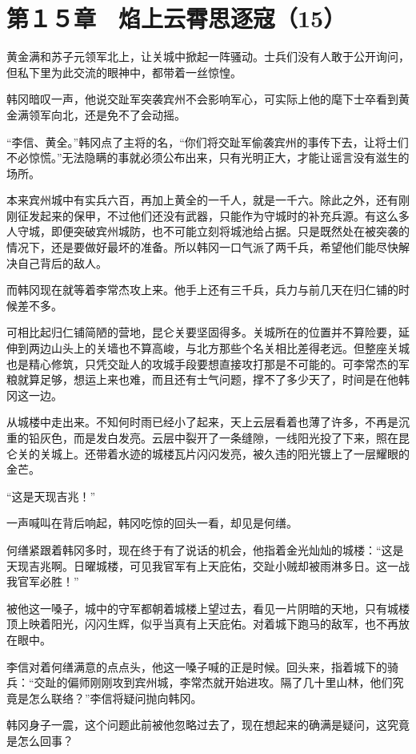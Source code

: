 \section{第１５章　焰上云霄思逐寇（15）}

黄金满和苏子元领军北上，让关城中掀起一阵骚动。士兵们没有人敢于公开询问，但私下里为此交流的眼神中，都带着一丝惊惶。

韩冈暗叹一声，他说交趾军突袭宾州不会影响军心，可实际上他的麾下士卒看到黄金满领军向北，还是免不了会动摇。

“李信、黄全。”韩冈点了主将的名，“你们将交趾军偷袭宾州的事传下去，让将士们不必惊慌。”无法隐瞒的事就必须公布出来，只有光明正大，才能让谣言没有滋生的场所。

本来宾州城中有实兵六百，再加上黄全的一千人，就是一千六。除此之外，还有刚刚征发起来的保甲，不过他们还没有武器，只能作为守城时的补充兵源。有这么多人守城，即便突破宾州城防，也不可能立刻将城池给占据。只是既然处在被突袭的情况下，还是要做好最坏的准备。所以韩冈一口气派了两千兵，希望他们能尽快解决自己背后的敌人。

而韩冈现在就等着李常杰攻上来。他手上还有三千兵，兵力与前几天在归仁铺的时候差不多。

可相比起归仁铺简陋的营地，昆仑关要坚固得多。关城所在的位置并不算险要，延伸到两边山头上的关墙也不算高峻，与北方那些个名关相比差得老远。但整座关城也是精心修筑，只凭交趾人的攻城手段要想直接攻打那是不可能的。可李常杰的军粮就算足够，想运上来也难，而且还有士气问题，撑不了多少天了，时间是在他韩冈这一边。

从城楼中走出来。不知何时雨已经小了起来，天上云层看着也薄了许多，不再是沉重的铅灰色，而是发白发亮。云层中裂开了一条缝隙，一线阳光投了下来，照在昆仑关的关城上。还带着水迹的城楼瓦片闪闪发亮，被久违的阳光镀上了一层耀眼的金芒。

“这是天现吉兆！”

一声喊叫在背后响起，韩冈吃惊的回头一看，却见是何缮。

何缮紧跟着韩冈多时，现在终于有了说话的机会，他指着金光灿灿的城楼：“这是天现吉兆啊。日曜城楼，可见我官军有上天庇佑，交趾小贼却被雨淋多日。这一战我官军必胜！”

被他这一嗓子，城中的守军都朝着城楼上望过去，看见一片阴暗的天地，只有城楼顶上映着阳光，闪闪生辉，似乎当真有上天庇佑。对着城下跑马的敌军，也不再放在眼中。

李信对着何缮满意的点点头，他这一嗓子喊的正是时候。回头来，指着城下的骑兵：“交趾的偏师刚刚攻到宾州城，李常杰就开始进攻。隔了几十里山林，他们究竟是怎么联络？”李信将疑问抛向韩冈。

韩冈身子一震，这个问题此前被他忽略过去了，现在想起来的确满是疑问，这究竟是怎么回事？

